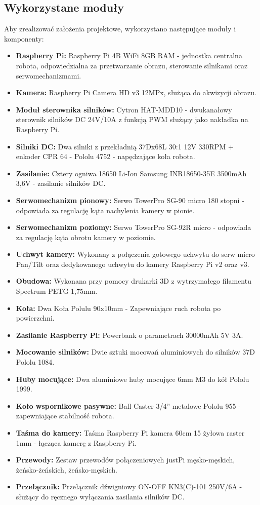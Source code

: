 \documentclass[a4paper,twoside,12pt]{book}
\begin{document}
\subsection{Wykorzystane moduły}
Aby zrealizować założenia projektowe, wykorzystano następujące moduły i komponenty:
\begin{itemize}
    \item \textbf{Raspberry Pi:} Raspberry Pi 4B WiFi 8GB RAM - jednostka centralna robota, odpowiedzialna za przetwarzanie obrazu, sterowanie silnikami oraz serwomechanizmami.
    \item \textbf{Kamera:} Raspberry Pi Camera HD v3 12MPx, służąca do akwizycji obrazu.
    \item \textbf{Moduł sterownika silników:} Cytron HAT-MDD10 - dwukanałowy sterownik silników DC 24V/10A z funkcją PWM służący jako nakładka na Raspberry Pi.
    \item \textbf{Silniki DC:} Dwa silniki z przekładnią 37Dx68L 30:1 12V 330RPM + enkoder CPR 64 - Pololu 4752 - napędzające koła robota.
    \item \textbf{Zasilanie:} Cztery ogniwa 18650 Li-Ion Samsung INR18650-35E 3500mAh 3,6V - zasilanie silników DC.
    \item \textbf{Serwomechanizm pionowy:} Serwo TowerPro SG-90 micro 180 stopni - odpowiada za regulację kąta nachylenia kamery w pionie.
    \item \textbf{Serwomechanizm poziomy:} Serwo TowerPro SG-92R micro - odpowiada za regulację kąta obrotu kamery w poziomie.
    \item \textbf{Uchwyt kamery:} Wykonany z połączenia gotowego uchwytu do serw micro Pan/Tilt oraz dedykowanego uchwytu do kamery Raspberry Pi v2 oraz v3.
    \item \textbf{Obudowa:} Wykonana przy pomocy drukarki 3D z wytrzymałego filamentu Spectrum PETG 1,75mm.
    \item \textbf{Koła:} Dwa Koła Polulu 90x10mm - Zapewniające ruch robota po powierzchni.
    \item \textbf{Zasilanie Raspberry Pi:} Powerbank o parametrach 30000mAh 5V 3A.
    \item \textbf{Mocowanie silników:} Dwie sztuki mocowań aluminiowych do silników 37D Pololu 1084. 
    \item \textbf{Huby mocujące:} Dwa aluminiowe huby mocujące 6mm M3 do kół Pololu 1999.
    \item \textbf{Koło wspornikowe pasywne:} Ball Caster 3/4'' metalowe Pololu 955 - zapewniające stabilność robota.
    \item \textbf{Taśma do kamery:} Taśma Raspberry Pi kamera 60cm 15 żyłowa raster 1mm - łącząca kamerę z Raspberry Pi.
    \item \textbf{Przewody:} Zestaw przewodów połączeniowych justPi męsko-męskich, żeńsko-żeńskich, żeńsko-męskich.
    \item \textbf{Przełącznik:} Przełącznik dźwigniowy ON-OFF KN3(C)-101 250V/6A - służący do ręcznego wyłączania zasilania silników DC.
\end{itemize}
\end{document}
